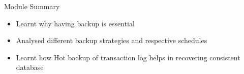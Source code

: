 \documentclass[aspectratio=169, xcolor=dvipsnames]{beamer}
\begin{document}
\begin{frame}{Module Summary}
    \begin{itemize}[<+->]
        \item Learnt why having backup is essential
        \item Analysed different backup strategies and respective schedules
        \item Learnt how Hot backup of transaction log helps in recovering consistent database
    \end{itemize}
    \vspace{2em}
\end{frame}
\end{document}
